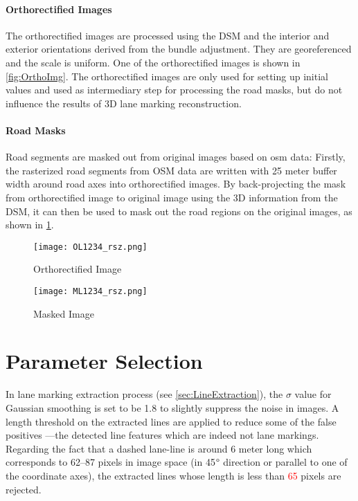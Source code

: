 \paragraph{Orthorectified Images}
The orthorectified images are processed using the DSM and the interior and exterior orientations derived from the bundle adjustment. They are georeferenced and the scale is uniform. One of the orthorectified images is shown in \cref{fig:OrthoImg}. The orthorectified images are only used for setting up initial values and used as intermediary step for processing the road masks, but do not influence the results of 3D lane marking reconstruction.

\paragraph{Road Masks}
Road segments are masked out from original images based on \gls{osm} data: Firstly, the rasterized road segments from OSM data are written with 25 meter buffer width around road axes into orthorectified images. By back-projecting the mask from orthorectified image to original image using the 3D information from the DSM, it can then be used to mask out the road regions on the original images, as shown in \cref{fig:MaskedImg}.

\begin{figure}%
	\centering
    	\texttt{[image: OL1234\_rsz.png]}
    	\caption{\small Orthorectified Image}
    	\label{fig:OrthoImg}
	\vspace{1cm}
		\texttt{[image: ML1234\_rsz.png]}
		\caption{\small Masked Image}
		\label{fig:MaskedImg}
\end{figure}

\clearpage
\section{Parameter Selection}
\label{sec:ParameterSelection}

In lane marking extraction process (see \cref{sec:LineExtraction}), the $\sigma$ value for Gaussian smoothing is set to be 1.8 to slightly suppress the noise in images. %
A length threshold on the extracted lines are applied to reduce some of the false positives ---the detected line features which are indeed not lane markings. Regarding the fact that a dashed lane-line is around 6 meter long which corresponds to 62--87 pixels in image space (in 45$\degree$ direction or parallel to one of the coordinate axes), the extracted lines whose length is less than \textcolor{red}{65} pixels are rejected.



